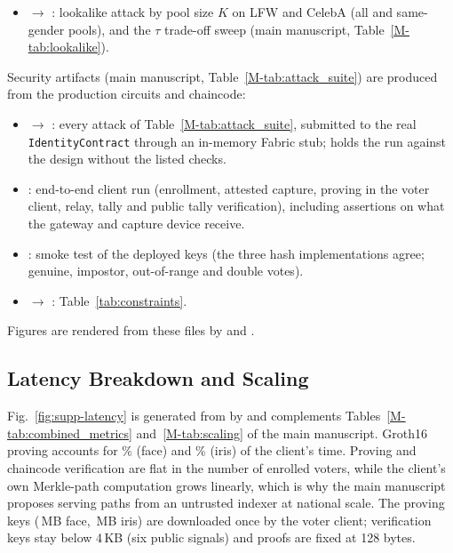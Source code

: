 \documentclass[10pt,letterpaper,journal]{IEEEtran}
\begin{document}
\begin{itemize}[leftmargin=*,noitemsep]
  \item {} $\rightarrow$ : lookalike attack by pool size $K$ on LFW and CelebA (all and same-gender pools), and the $\tau$ trade-off sweep (main manuscript, Table~\ref{M-tab:lookalike}).
\end{itemize}
Security artifacts (main manuscript, Table~\ref{M-tab:attack_suite}) are produced from the production circuits and chaincode:
\begin{itemize}[leftmargin=*,noitemsep]
  \item {} $\rightarrow$ : every attack of Table~\ref{M-tab:attack_suite}, submitted to the real \texttt{IdentityContract} through an in-memory Fabric stub;  holds the run against the design without the listed checks.
  \item {}: end-to-end client run (enrollment, attested capture, proving in the voter client, relay, tally and public tally verification), including assertions on what the gateway and capture device receive.
  \item {}: smoke test of the deployed keys (the three hash implementations agree; genuine, impostor, out-of-range and double votes).
  \item {} $\rightarrow$ : Table~\ref{tab:constraints}.
\end{itemize}
Figures are rendered from these files by  and .

\subsection{Latency Breakdown and Scaling}
Fig.~\ref{fig:supp-latency} is generated from  by  and complements Tables~\ref{M-tab:combined_metrics} and~\ref{M-tab:scaling} of the main manuscript. Groth16 proving accounts for \nProveShare\% (face) and \nIrisProveShare\% (iris) of the client's time. Proving and chaincode verification are flat in the number of enrolled voters, while the client's own Merkle-path computation grows linearly, which is why the main manuscript proposes serving paths from an untrusted indexer at national scale. The proving keys (\nKeyMB\,MB face, \nIrisKeyMB\,MB iris) are downloaded once by the voter client; verification keys stay below 4\,KB (six public signals) and proofs are fixed at 128 bytes.
\end{document}
